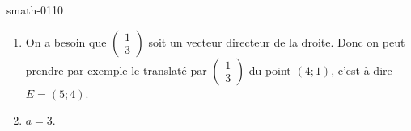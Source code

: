 
\begin{corrige}{smath-0110}

    \begin{enumerate}
        \item
    On a besoin que \( \begin{pmatrix}
        1    \\ 
        3    
    \end{pmatrix}\) soit un vecteur directeur de la droite. Donc on peut prendre par exemple le translaté par \( \begin{pmatrix}
        1    \\ 
         3   
    \end{pmatrix}\) du point \( (4;1)\), c'est à dire \( E=(5;4)\).
        \item
            \( a=3\).

    \end{enumerate}

\end{corrige}
